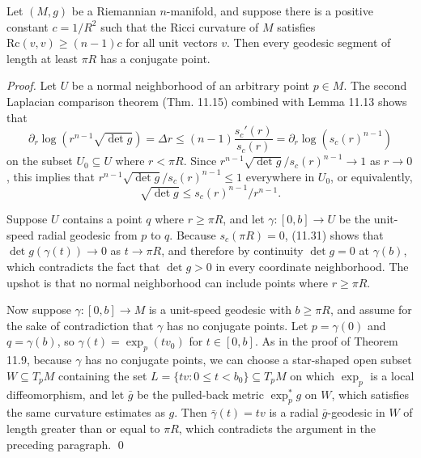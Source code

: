 \begin{theorem}
\label{thm:conjugate-points-ricci-bounded}

Let $(M, g)$ be a Riemannian $n$-manifold, and suppose there is a positive constant $c = 1/R^2$ such that the Ricci curvature of $M$ satisfies $\mathrm{Rc}(v,v) \geq (n-1)c$ for all unit vectors $v$. Then every geodesic segment of length at least $\pi R$ has a conjugate point.

\begin{proof}
Let $U$ be a normal neighborhood of an arbitrary point $p \in M$. The second Laplacian comparison theorem (Thm. 11.15) combined with Lemma 11.13 shows that
\[
\partial_r \log(r^{n-1}\sqrt{\det g}) = \Delta r \leq (n-1) \frac{s_c'(r)}{s_c(r)} = \partial_r \log(s_c(r)^{n-1})
\]
on the subset $U_0 \subseteq U$ where $r < \pi R$. Since $r^{n-1}\sqrt{\det g}/s_c(r)^{n-1} \to 1$ as $r \to 0$, this implies that $r^{n-1}\sqrt{\det g}/s_c(r)^{n-1} \leq 1$ everywhere in $U_0$, or equivalently,
\begin{equation}
\sqrt{\det g} \leq s_c(r)^{n-1}/r^{n-1}. \tag{11.31}
\end{equation}

Suppose $U$ contains a point $q$ where $r \geq \pi R$, and let $\gamma : [0,b] \to U$ be the unit-speed radial geodesic from $p$ to $q$. Because $s_c(\pi R) = 0$, (11.31) shows that $\det g(\gamma(t)) \to 0$ as $t \to \pi R$, and therefore by continuity $\det g = 0$ at $\gamma(b)$, which contradicts the fact that $\det g > 0$ in every coordinate neighborhood. The upshot is that no normal neighborhood can include points where $r \geq \pi R$.

Now suppose $\gamma : [0,b] \to M$ is a unit-speed geodesic with $b \geq \pi R$, and assume for the sake of contradiction that $\gamma$ has no conjugate points. Let $p = \gamma(0)$ and $q = \gamma(b)$, so $\gamma(t) = \exp_p(tv_0)$ for $t \in [0, b]$. As in the proof of Theorem 11.9, because $\gamma$ has no conjugate points, we can choose a star-shaped open subset $W \subseteq T_pM$ containing the set $L = \{tv : 0 \leq t < b_0\} \subseteq T_pM$ on which $\exp_p$ is a local diffeomorphism, and let $\bar{g}$ be the pulled-back metric $\exp_p^* g$ on $W$, which satisfies the same curvature estimates as $g$. Then $\bar{\gamma}(t) = tv$ is a radial $\bar{g}$-geodesic in $W$ of length greater than or equal to $\pi R$, which contradicts the argument in the preceding paragraph. \qed
\end{proof}
\end{theorem}

